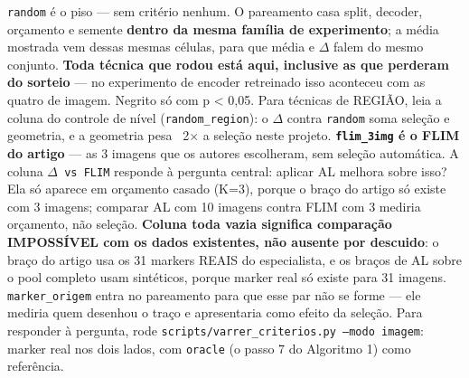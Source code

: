 \footnotesize \texttt{random} é o piso --- sem critério nenhum. O pareamento casa split, decoder, orçamento e semente \textbf{dentro da mesma família de experimento}; a média mostrada vem dessas mesmas células, para que média e $\Delta$ falem do mesmo conjunto. \textbf{Toda técnica que rodou está aqui, inclusive as que perderam do sorteio} --- no experimento de encoder retreinado isso aconteceu com as quatro de imagem. Negrito só com p < 0,05. Para técnicas de REGIÃO, leia a coluna do controle de nível (\texttt{random\_region}): o $\Delta$ contra \texttt{random} soma seleção e geometria, e a geometria pesa ~2$\times$ a seleção neste projeto. \textbf{\texttt{flim\_3img} é o FLIM do artigo} --- as 3 imagens que os autores escolheram, sem seleção automática. A coluna \texttt{$\Delta$ vs FLIM} responde à pergunta central: aplicar AL melhora sobre isso? Ela só aparece em orçamento casado (K=3), porque o braço do artigo só existe com 3 imagens; comparar AL com 10 imagens contra FLIM com 3 mediria orçamento, não seleção. \textbf{Coluna toda vazia significa comparação IMPOSSÍVEL com os dados existentes, não ausente por descuido}: o braço do artigo usa os 31 markers REAIS do especialista, e os braços de AL sobre o pool completo usam sintéticos, porque marker real só existe para 31 imagens. \texttt{marker\_origem} entra no pareamento para que esse par não se forme --- ele mediria quem desenhou o traço e apresentaria como efeito da seleção. Para responder à pergunta, rode \texttt{scripts/varrer\_criterios.py --modo imagem}: marker real nos dois lados, com \texttt{oracle} (o passo 7 do Algoritmo 1) como referência.
\normalsize
